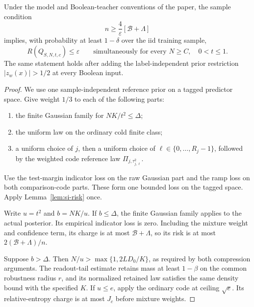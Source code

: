 \begin{theorem}
\label{thm:weighted-all-scales}
Under the model and Boolean-teacher conventions of the paper, the
sample condition
\begin{equation}\label{eq:weighted-sample-budget}
 n\ge\frac4\varepsilon[\mathcal B+\Lambda]
\end{equation}
implies, with probability at least $1-\delta$ over the iid training
sample,
\[
 R(Q_{S,N,t,c})\le\varepsilon
 \qquad\text{simultaneously for every }N\ge C,
                      \quad0<t\le1.
\]
The same statement holds after adding the label-independent prior
restriction $|z_w(x)|>1/2$ at every Boolean input.
\end{theorem}
\begin{proof}
We use one sample-independent reference prior on a tagged predictor
space. Give weight $1/3$ to each of the following parts:
\begin{enumerate}
\item the finite Gaussian family for $NK/t^2\le\Delta$;
\item the uniform law on the ordinary cold finite class;
\item a uniform choice of $j$, then a uniform choice of
$\ell\in\{0,\ldots,R_j-1\}$, followed by the weighted code reference
law $\Pi_{j,\tau_{j,\ell}^2}$.
\end{enumerate}
Use the test-margin indicator loss on the raw Gaussian part and the
ramp loss on both comparison-code parts. These form one bounded loss
on the tagged space. Apply Lemma~\ref{lem:si-risk} once.

Write $u=t^2$ and $b=NK/u$. If $b\le\Delta$, the finite Gaussian
family applies to the actual posterior. Its empirical indicator loss
is zero. Including the mixture weight and confidence term, its charge
is at most $\mathcal B+\Lambda$, so its risk is at most
$2(\mathcal B+\Lambda)/n$.

Suppose $b>\Delta$. Then
$N/u>\max\{1,2LD_0/K\}$, as required by both compression arguments.
The readout-tail estimate retains mass at least $1-\beta$ on the common
robustness radius $r$, and its normalized retained law satisfies the
same density bound with the specified $K$.
If $u\le e$, apply the ordinary code at ceiling $\sqrt e$. Its
relative-entropy charge is at most $J_c$ before mixture weights.


\end{proof}
